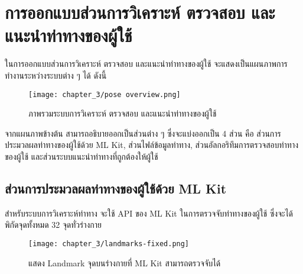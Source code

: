 \section{การออกแบบส่วนการวิเคราะห์ ตรวจสอบ และแนะนำท่าทางของผู้ใช้}
ในการออกแบบส่วนการวิเคราะห์ ตรวจสอบ และแนะนำท่าทางของผู้ใช้ จะแสดงเป็นแผนภาพการทำงานระหว่างระบบต่าง ๆ ได้ ดังนี้
\begin{figure}
    \texttt{[image: chapter\_3/pose overview.png]}
    \caption{ภาพรวมระบบการวิเคราะห์ ตรวจสอบ และแนะนำท่าทางของผู้ใช้}
\end{figure}
จากแผนภาพข้างต้น สามารถอธิบายออกเป็นส่วนต่าง ๆ ซึ่งจะแบ่งออกเป็น 4 ส่วน คือ ส่วนการประมวลผลท่าทางของผู้ใช้ด้วย ML Kit, ส่วนไฟล์ข้อมูลท่าทาง, ส่วนอัลกอริทึมการตรวจสอบท่าทางของผู้ใช้ และส่วนระบบแนะนำท่าทางที่ถูกต้องให้ผู้ใช้

\subsection{ส่วนการประมวลผลท่าทางของผู้ใช้ด้วย ML Kit}
สำหรับระบบการวิเคราะห์ท่าทาง จะใช้ API ของ ML Kit ในการตรวจจับท่าทางของผู้ใช้ ซึ่งจะได้พิกัดจุดทั้งหมด 32 จุดทั่วร่างกาย
\begin{figure}
    \texttt{[image: chapter\_3/landmarks-fixed.png]}
    \caption{แสดง Landmark จุดบนร่างกายที่ ML Kit สามารถตรวจจับได้}
\end{figure}

